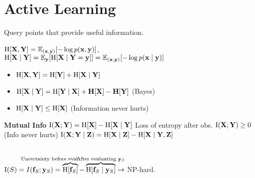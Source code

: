 \section{Active Learning}

Query points that provide useful information.

\begin{colored}
    \(\operatorname{H}[\vb{X}, \vb{Y}] = \mathbb{E}_{(\vb{x},\vb{y})}[-\log p(\vb{x}, \vb{y})]\),
    \(\operatorname{H}[\vb{X}\mid\vb{Y}] = \mathbb{E}_{\vb{y}}[\operatorname{H}[\vb{X} \mid \vb{Y} = \vb{y}]] = \mathbb{E}_{(\vb{x},\vb{y})}[-\log p(\vb{x} \mid \vb{y})]\)
    \begin{itemize}
        \item \(\operatorname{H}[\vb{X}, \vb{Y}] = \operatorname{H}[\vb{Y}] + \operatorname{H}[\vb{X} \mid \vb{Y}]\)
        \item \(\operatorname{H}[\vb{X} \mid \vb{Y}] = \operatorname{H}[\vb{Y} \mid \vb{X}] + \vb{H}[\vb{X}] - \vb{H}[\vb{Y}]\) (Bayes)
        \item \(\operatorname{H}[\vb{X}\mid\vb{Y}] \leq \operatorname{H}[\vb{X}]\) (Information never hurts)
    \end{itemize}
\end{colored}

\begin{colored}
    \textbf{Mutual Info}
    \(\operatorname{I}(\vb{X}; \vb{Y}) = \operatorname{H}[\vb{X}] - \operatorname{H}[\vb{X} \mid \vb{Y}]\)
    Loss of entropy after obs. \(\operatorname{I}(\vb{X};\vb{Y}) \geq 0\) (Info never hurts)
    \(\operatorname{I}(\vb{X}; \vb{Y} \mid \vb{Z}) = \operatorname{H}[\vb{X} \mid \vb{Z}] - \operatorname{H}[\vb{X} \mid \vb{Y}, \vb{Z}]\)
\end{colored}



\begin{definition}\ \\
    \(\MI(S) = I(\f_S; \y_S) = \overbrace{\Ent[\f_S]}^{\mathclap{\hspace{-60pt}\text{Uncertainty before eval}}} - \overbrace{\Ent[\f_S \mid \y_S]}^{\mathclap{\text{After evaluating } \y_S}} \to\)
    NP-hard.
\end{definition}

